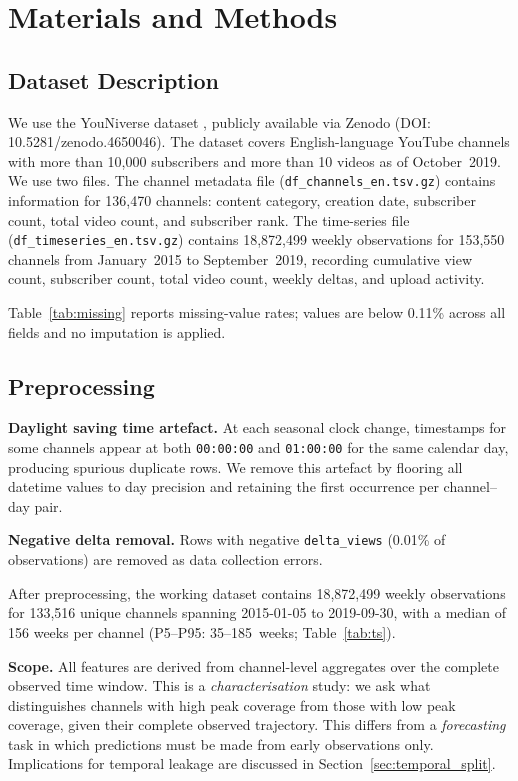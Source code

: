\documentclass[journal,article,submit,pdftex,moreauthors]{Definitions/mdpi}
\begin{document}
\section{Materials and Methods}
\label{sec:methods}

\subsection{Dataset Description}
\label{sec:dataset}

We use the YouNiverse dataset \cite{ref-ribeiro2021}, publicly available
via Zenodo (DOI: 10.5281/zenodo.4650046).
The dataset covers English-language YouTube channels with more than
10,000 subscribers and more than 10 videos as of October~2019.
We use two files.
The channel metadata file (\texttt{df\_channels\_en.tsv.gz}) contains
information for 136,470 channels: content category, creation date,
subscriber count, total video count, and subscriber rank.
The time-series file (\texttt{df\_timeseries\_en.tsv.gz}) contains
18,872,499 weekly observations for 153,550 channels from January~2015
to September~2019, recording cumulative view count, subscriber count,
total video count, weekly deltas, and upload activity.

Table~\ref{tab:missing} reports missing-value rates; values are below
0.11\% across all fields and no imputation is applied.

\subsection{Preprocessing}
\label{sec:preprocessing}

\textbf{Daylight saving time artefact.}
At each seasonal clock change, timestamps for some channels appear at
both \texttt{00:00:00} and \texttt{01:00:00} for the same calendar day,
producing spurious duplicate rows.
We remove this artefact by flooring all datetime values to day precision
and retaining the first occurrence per channel--day pair.

\textbf{Negative delta removal.}
Rows with negative \texttt{delta\_views} (0.01\% of observations) are
removed as data collection errors.

After preprocessing, the working dataset contains 18,872,499 weekly
observations for 133,516 unique channels spanning
2015-01-05 to 2019-09-30, with a median of 156 weeks per channel
(P5--P95: 35--185~weeks; Table~\ref{tab:ts}).

\textbf{Scope.}
All features are derived from channel-level aggregates over the complete
observed time window.
This is a \emph{characterisation} study: we ask what distinguishes channels
with high peak coverage from those with low peak coverage, given their
complete observed trajectory.
This differs from a \emph{forecasting} task in which predictions must be
made from early observations only.
Implications for temporal leakage are discussed in
Section~\ref{sec:temporal_split}.
\end{document}
